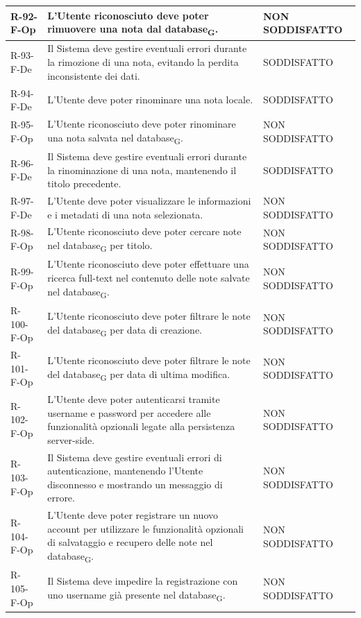 \documentclass[a4paper, 10pt]{article}
\begin{document}
\begin{longtable}{|p{2.1cm}|p{9.6cm}|p{2.6cm}|}
    R-92-F-Op & L'Utente riconosciuto deve poter rimuovere una nota dal database\textsubscript{G}. & NON SODDISFATTO \\ \hline
    R-93-F-De & Il Sistema deve gestire eventuali errori durante la rimozione di una nota, evitando la perdita inconsistente dei dati. & SODDISFATTO \\ \hline
    R-94-F-De & L'Utente deve poter rinominare una nota locale. & SODDISFATTO \\ \hline
    R-95-F-Op & L'Utente riconosciuto deve poter rinominare una nota salvata nel database\textsubscript{G}. & NON SODDISFATTO \\ \hline
    R-96-F-De & Il Sistema deve gestire eventuali errori durante la rinominazione di una nota, mantenendo il titolo precedente. & SODDISFATTO \\ \hline
    R-97-F-De & L'Utente deve poter visualizzare le informazioni e i metadati di una nota selezionata. & NON SODDISFATTO \\ \hline
    R-98-F-Op & L'Utente riconosciuto deve poter cercare note nel database\textsubscript{G} per titolo. & NON SODDISFATTO \\ \hline
    R-99-F-Op & L'Utente riconosciuto deve poter effettuare una ricerca full-text nel contenuto delle note salvate nel database\textsubscript{G}. & NON SODDISFATTO \\ \hline
    R-100-F-Op & L'Utente riconosciuto deve poter filtrare le note del database\textsubscript{G} per data di creazione. & NON SODDISFATTO \\ \hline
    R-101-F-Op & L'Utente riconosciuto deve poter filtrare le note del database\textsubscript{G} per data di ultima modifica. & NON SODDISFATTO \\ \hline
    R-102-F-Op & L'Utente deve poter autenticarsi tramite username e password per accedere alle funzionalità opzionali legate alla persistenza server-side. & NON SODDISFATTO \\ \hline
    R-103-F-Op & Il Sistema deve gestire eventuali errori di autenticazione, mantenendo l'Utente disconnesso e mostrando un messaggio di errore. & NON SODDISFATTO \\ \hline
    R-104-F-Op & L'Utente deve poter registrare un nuovo account per utilizzare le funzionalità opzionali di salvataggio e recupero delle note nel database\textsubscript{G}. & NON SODDISFATTO \\ \hline
    R-105-F-Op & Il Sistema deve impedire la registrazione con uno username già presente nel database\textsubscript{G}. & NON SODDISFATTO \\ \hline

\end{longtable}
\end{document}
